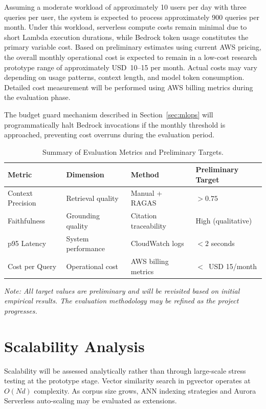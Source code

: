 \documentclass[12pt,a4paper]{report}
\begin{document}
Assuming a moderate workload of approximately 10 users per day with three queries per user, the system is expected to process approximately 900 queries per month. Under this workload, serverless compute costs remain minimal due to short Lambda execution durations, while Bedrock token usage constitutes the primary variable cost. Based on preliminary estimates using current AWS pricing, the overall monthly operational cost is expected to remain in a low-cost research prototype range of approximately USD~10--15 per month. Actual costs may vary depending on usage patterns, context length, and model token consumption. Detailed cost measurement will be performed using AWS billing metrics during the evaluation phase.

The budget guard mechanism described in Section~\ref{sec:mlops} will programmatically halt Bedrock invocations if the monthly threshold is approached, preventing cost overruns during the evaluation period.

\begin{table}[H]
\caption{Summary of Evaluation Metrics and Preliminary Targets.}
\label{tab:eval_targets}
\centering
\begin{tabular}{p{3.0cm}p{3.0cm}p{3.2cm}p{3.0cm}}
\toprule
\textbf{Metric} & \textbf{Dimension} & \textbf{Method} & \textbf{Preliminary Target} \\
\midrule
Context Precision & Retrieval quality & Manual + RAGAS & $> 0.75$ \\
Faithfulness & Grounding quality & Citation traceability & High (qualitative) \\
p95 Latency & System performance & CloudWatch logs & $< 2$ seconds \\
Cost per Query & Operational cost & AWS billing metrics & $<$~USD 15/month \\
\bottomrule
\end{tabular}
\end{table}

\textit{Note: All target values are preliminary and will be revisited based on initial empirical results. The evaluation methodology may be refined as the project progresses.}

\section{Scalability Analysis}
\label{sec:scalability}

Scalability will be assessed analytically rather than through large-scale stress testing at the prototype stage. Vector similarity search in pgvector operates at $O(Nd)$ complexity. As corpus size grows, ANN indexing strategies and Aurora Serverless auto-scaling may be evaluated as extensions.
\end{document}
